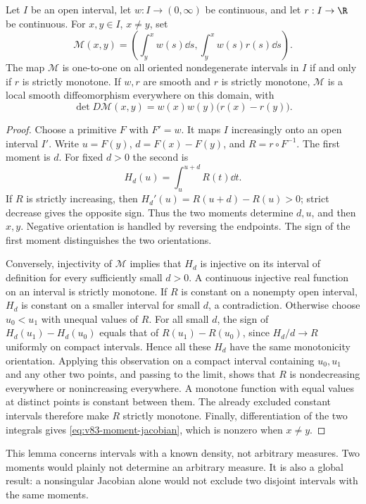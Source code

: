 \begin{lemma}\label{lem:v83-interval}
Let $I$ be an open interval, let $w:I\to(0,\infty)$ be continuous, and
let $r:I\to\R$ be continuous. For $x,y\in I$, $x\ne y$, set
\[
 \mathcal M(x,y)=\left(\int_y^x w(s)\dd s,
                       \int_y^x w(s)r(s)\dd s\right).
\]
The map $\mathcal M$ is one-to-one on all oriented nondegenerate
intervals in $I$ if and only if $r$ is strictly monotone.
If $w,r$ are smooth and $r$ is strictly monotone, $\mathcal M$ is a
local smooth diffeomorphism everywhere on this domain, with
\begin{equation}\label{eq:v83-moment-jacobian}
 \det D\mathcal M(x,y)=w(x)w(y)\bigl(r(x)-r(y)\bigr).
\end{equation}
\end{lemma}
\begin{proof}
Choose a primitive $F$ with $F'=w$. It maps $I$ increasingly onto an
open interval $I'$. Write $u=F(y)$, $d=F(x)-F(y)$, and
$R=r\circ F^{-1}$. The first moment is $d$. For fixed $d>0$ the
second is
\[
 H_d(u)=\int_u^{u+d}R(t)\dd t.
\]
If $R$ is strictly increasing, then
$H_d'(u)=R(u+d)-R(u)>0$; strict decrease gives the opposite sign.
Thus the two moments determine $d,u$, and then $x,y$. Negative
orientation is handled by reversing the endpoints. The sign of the
first moment distinguishes the two orientations.

Conversely, injectivity of $\mathcal M$ implies that $H_d$ is injective
on its interval of definition for every sufficiently small $d>0$.
A continuous injective real function on an interval is strictly
monotone. If $R$ is constant on a nonempty open interval, $H_d$ is
constant on a smaller interval for small $d$, a contradiction.
Otherwise choose $u_0<u_1$ with unequal values of $R$. For all small
$d$, the sign of $H_d(u_1)-H_d(u_0)$ equals that of
$R(u_1)-R(u_0)$, since $H_d/d\to R$ uniformly on compact intervals.
Hence all these $H_d$ have the same monotonicity orientation. Applying
this observation on a compact interval containing $u_0,u_1$ and any
other two points, and passing to the limit, shows that $R$ is
nondecreasing everywhere or nonincreasing everywhere. A monotone
function with equal values at distinct points is constant between
them. The already excluded constant intervals therefore make $R$
strictly monotone. Finally, differentiation of the two integrals gives
\eqref{eq:v83-moment-jacobian}, which is nonzero when $x\ne y$.
\end{proof}

This lemma concerns intervals with a known density, not arbitrary
measures. Two moments would plainly not determine an arbitrary measure.
It is also a global result: a nonsingular Jacobian alone would not
exclude two disjoint intervals with the same moments.

